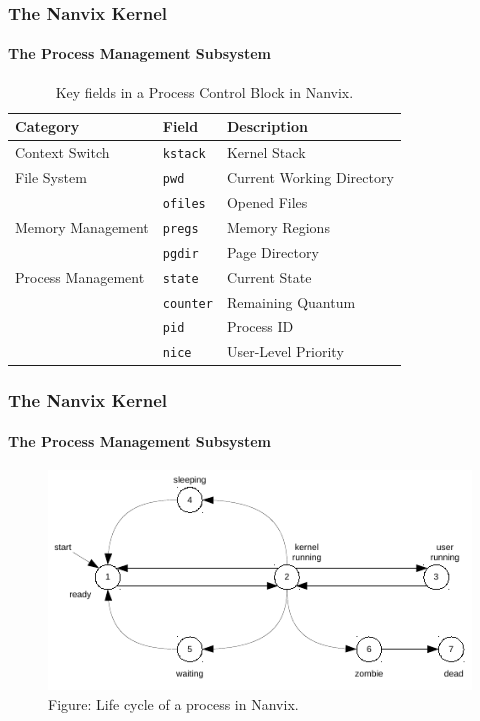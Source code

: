 \documentclass{beamer}
\begin{document}
		\begin{frame}
		\frametitle{The Nanvix Kernel}
		\framesubtitle{The Process Management Subsystem}
			\begin{table}
				\caption{Key fields in a Process Control Block in Nanvix.}
				\begin{tabular}{l l l}
					\toprule
					\textbf{Category}  & \textbf{Field}   & \textbf{Description}      \\
					\midrule
					Context Switch     & \texttt{kstack}  & Kernel Stack              \\[0.4em]
					File System        & \texttt{pwd}     & Current Working Directory \\
					                   & \texttt{ofiles}  & Opened Files              \\[0.4em] 
					Memory Management  & \texttt{pregs}   & Memory Regions            \\ 
					                   & \texttt{pgdir}   & Page Directory            \\[0.4em]
					Process Management & \texttt{state}   & Current State             \\ 
					                   & \texttt{counter} & Remaining Quantum         \\ 
					                   & \texttt{pid}     & Process ID                \\ 
					                   & \texttt{nice}    & User-Level Priority       \\ 
					\bottomrule
				\end{tabular}
			\end{table}
		\end{frame}

		\begin{frame}
		\frametitle{The Nanvix Kernel}
		\framesubtitle{The Process Management Subsystem}
			\begin{figure}
				\centering
				\includegraphics[width=\linewidth]{process-states}
				\caption{Figure: Life cycle of a process in Nanvix.}
			\end{figure}
		\end{frame}
\end{document}
